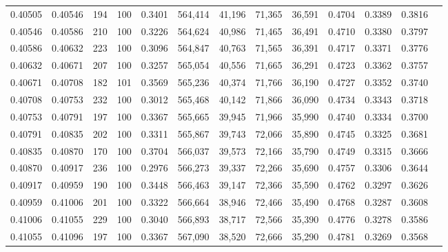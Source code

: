 \begin{tabular}{rrrrrrrrrrrrr}
0.40505 & 0.40546 &   194 & 100 &                                     0.3401 & 564,414 &  41,196 &  71,365 &  36,591 & 0.4704 & 0.3389 & 0.3816 \\
0.40546 & 0.40586 &   210 & 100 &                                     0.3226 & 564,624 &  40,986 &  71,465 &  36,491 & 0.4710 & 0.3380 & 0.3797 \\
0.40586 & 0.40632 &   223 & 100 &                                     0.3096 & 564,847 &  40,763 &  71,565 &  36,391 & 0.4717 & 0.3371 & 0.3776 \\
0.40632 & 0.40671 &   207 & 100 &                                     0.3257 & 565,054 &  40,556 &  71,665 &  36,291 & 0.4723 & 0.3362 & 0.3757 \\
0.40671 & 0.40708 &   182 & 101 &                                     0.3569 & 565,236 &  40,374 &  71,766 &  36,190 & 0.4727 & 0.3352 & 0.3740 \\
0.40708 & 0.40753 &   232 & 100 &                                     0.3012 & 565,468 &  40,142 &  71,866 &  36,090 & 0.4734 & 0.3343 & 0.3718 \\
0.40753 & 0.40791 &   197 & 100 &                                     0.3367 & 565,665 &  39,945 &  71,966 &  35,990 & 0.4740 & 0.3334 & 0.3700 \\
0.40791 & 0.40835 &   202 & 100 &                                     0.3311 & 565,867 &  39,743 &  72,066 &  35,890 & 0.4745 & 0.3325 & 0.3681 \\
0.40835 & 0.40870 &   170 & 100 &                                     0.3704 & 566,037 &  39,573 &  72,166 &  35,790 & 0.4749 & 0.3315 & 0.3666 \\
0.40870 & 0.40917 &   236 & 100 &                                     0.2976 & 566,273 &  39,337 &  72,266 &  35,690 & 0.4757 & 0.3306 & 0.3644 \\
0.40917 & 0.40959 &   190 & 100 &                                     0.3448 & 566,463 &  39,147 &  72,366 &  35,590 & 0.4762 & 0.3297 & 0.3626 \\
0.40959 & 0.41006 &   201 & 100 &                                     0.3322 & 566,664 &  38,946 &  72,466 &  35,490 & 0.4768 & 0.3287 & 0.3608 \\
0.41006 & 0.41055 &   229 & 100 &                                     0.3040 & 566,893 &  38,717 &  72,566 &  35,390 & 0.4776 & 0.3278 & 0.3586 \\
0.41055 & 0.41096 &   197 & 100 &                                     0.3367 & 567,090 &  38,520 &  72,666 &  35,290 & 0.4781 & 0.3269 & 0.3568 \\

\end{tabular}
